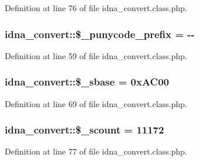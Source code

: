 Definition at line 76 of file idna\+\_\+convert.\+class.\+php.

\subsubsection[{\texorpdfstring{\$\+\_\+punycode\+\_\+prefix}{$_punycode_prefix}}]{\setlength{\rightskip}{0pt plus 5cm}idna\+\_\+convert\+::\$\+\_\+punycode\+\_\+prefix = -\/-\/\textquotesingle{}\hspace{0.3cm}{\ttfamily [protected]}}\hypertarget{classidna__convert_a314677b13ded35e088abec26ef7c8be8}{}\label{classidna__convert_a314677b13ded35e088abec26ef7c8be8}


Definition at line 59 of file idna\+\_\+convert.\+class.\+php.

\subsubsection[{\texorpdfstring{\$\+\_\+sbase}{$_sbase}}]{\setlength{\rightskip}{0pt plus 5cm}idna\+\_\+convert\+::\$\+\_\+sbase = 0x\+A\+C00\hspace{0.3cm}{\ttfamily [protected]}}\hypertarget{classidna__convert_ab4e5849131d5a242fc67d3bb75f81899}{}\label{classidna__convert_ab4e5849131d5a242fc67d3bb75f81899}


Definition at line 69 of file idna\+\_\+convert.\+class.\+php.

\subsubsection[{\texorpdfstring{\$\+\_\+scount}{$_scount}}]{\setlength{\rightskip}{0pt plus 5cm}idna\+\_\+convert\+::\$\+\_\+scount = 11172\hspace{0.3cm}{\ttfamily [protected]}}\hypertarget{classidna__convert_aa422586662f0878841bd8dcda663c058}{}\label{classidna__convert_aa422586662f0878841bd8dcda663c058}


Definition at line 77 of file idna\+\_\+convert.\+class.\+php.


